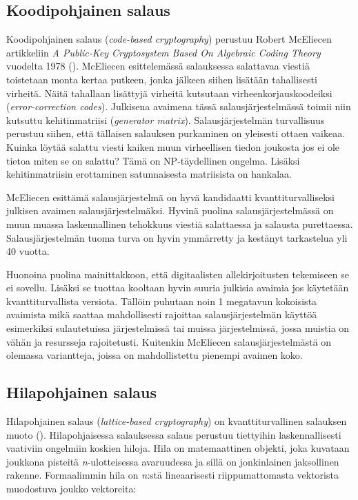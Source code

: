 \subsection{Koodipohjainen salaus}
Koodipohjainen salaus (\emph{code-based cryptography}) perustuu Robert McEliecen artikkeliin \emph{A Public-Key Cryptosystem Based On Algebraic Coding Theory} vuodelta 1978 (\cite{8012331}). McEliecen esittelemässä salauksessa salattavaa viestiä toistetaan monta kertaa putkeen, jonka jälkeen siihen lisätään tahallisesti virheitä. Näitä tahallaan lisättyjä virheitä kutsutaan virheenkorjauskoodeiksi (\emph{error-correction codes}). Julkisena avaimena tässä salausjärjestelmässä toimii niin kutsuttu kehitinmatriisi (\emph{generator matrix}). Salausjärjestelmän turvallisuus perustuu siihen, että tällaisen salauksen purkaminen on yleisesti ottaen vaikeaa. Kuinka löytää salattu viesti kaiken muun virheellisen tiedon joukosta jos ei ole tietoa miten se on salattu? Tämä on NP-täydellinen ongelma. Lisäksi kehitinmatriisin erottaminen satunnaisesta matriisista on hankalaa.

McEliecen esittämä salausjärjestelmä on hyvä kandidaatti kvanttiturvalliseksi julkisen avaimen salausjärjestelmäksi. Hyvinä puolina salausjärjestelmässä on muun muassa laskennallinen tehokkuus viestiä salattaessa ja salausta purettaessa. Salausjärjestelmän tuoma turva on hyvin ymmärretty ja kestänyt tarkastelua yli 40 vuotta.

Huonoina puolina mainittakkoon, että digitaalisten allekirjoitusten tekemiseen se ei sovellu. Lisäksi se tuottaa kooltaan hyvin suuria julkisia avaimia jos käytetään kvanttiturvallista versiota. Tällöin puhutaan noin 1 megatavun kokoisista avaimista mikä saattaa mahdollisesti rajoittaa salausjärjestelmän käyttöä esimerkiksi sulautetuissa järjestelmissä tai muissa järjestelmissä, jossa muistia on vähän ja resursseja rajoitetusti. Kuitenkin McEliecen salausjärjestelmästä on olemassa variantteja, joissa on mahdollistettu pienempi avaimen koko.


\subsection{Hilapohjainen salaus}
Hilapohjainen salaus (\emph{lattice-based cryptography}) on kvanttiturvallinen salauksen muoto (\cite{regev2006lattice}). Hilapohjaisessa salauksessa salaus perustuu tiettyihin laskennallisesti vaativiin ongelmiin koskien hiloja. Hila on matemaattinen objekti, joka kuvataan joukkona pisteitä \emph{n}-ulotteisessa avaruudessa ja sillä on jonkinlainen jaksollinen rakenne. Formaalimmin hila on \emph{n}:stä lineaarisesti riippumattomasta vektorista muodostuva joukko vektoreita: 

